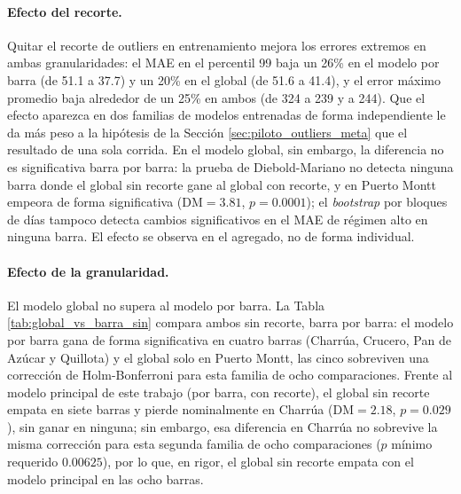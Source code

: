 \paragraph{Efecto del recorte.} Quitar el recorte de outliers en entrenamiento mejora los errores extremos en ambas granularidades: el MAE en el percentil 99 baja un 26\% en el modelo por barra (de 51.1 a 37.7) y un 20\% en el global (de 51.6 a 41.4), y el error máximo promedio baja alrededor de un 25\% en ambos (de 324 a 239 y a 244). Que el efecto aparezca en dos familias de modelos entrenadas de forma independiente le da más peso a la hipótesis de la Sección \ref{sec:piloto_outliers_meta} que el resultado de una sola corrida. En el modelo global, sin embargo, la diferencia no es significativa barra por barra: la prueba de Diebold-Mariano no detecta ninguna barra donde el global sin recorte gane al global con recorte, y en Puerto Montt empeora de forma significativa ($\mathrm{DM}=3.81$, $p=0.0001$); el \textit{bootstrap} por bloques de días tampoco detecta cambios significativos en el MAE de régimen alto en ninguna barra. El efecto se observa en el agregado, no de forma individual.

\paragraph{Efecto de la granularidad.} El modelo global no supera al modelo por barra. La Tabla \ref{tab:global_vs_barra_sin} compara ambos sin recorte, barra por barra: el modelo por barra gana de forma significativa en cuatro barras (Charrúa, Crucero, Pan de Azúcar y Quillota) y el global solo en Puerto Montt, las cinco sobreviven una corrección de Holm-Bonferroni para esta familia de ocho comparaciones. Frente al modelo principal de este trabajo (por barra, con recorte), el global sin recorte empata en siete barras y pierde nominalmente en Charrúa ($\mathrm{DM}=2.18$, $p=0.029$), sin ganar en ninguna; sin embargo, esa diferencia en Charrúa no sobrevive la misma corrección para esta segunda familia de ocho comparaciones ($p$ mínimo requerido $0.00625$), por lo que, en rigor, el global sin recorte empata con el modelo principal en las ocho barras.

